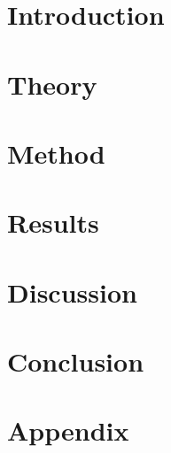 \documentclass{article}
\begin{document}


\newpage
\tableofcontents
\newpage
\section{Introduction}

\newpage
\section{Theory}
\newpage
\section{Method}
\newpage
\section{Results}
\newpage
\section{Discussion}
\newpage
\section{Conclusion}
\newpage
\section*{Appendix}
\end{document}
